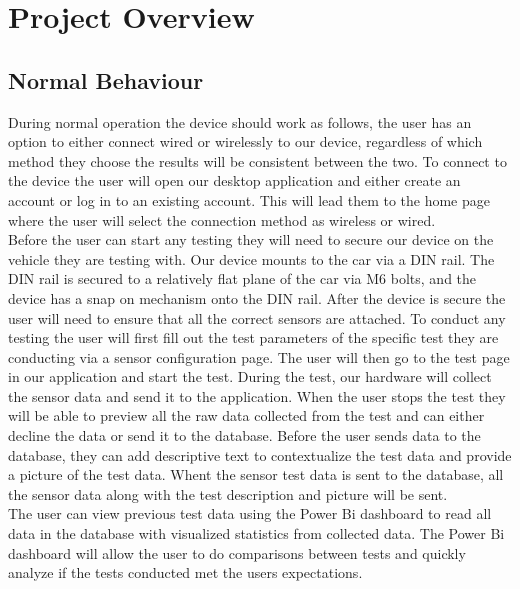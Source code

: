 \documentclass[12pt, titlepage]{article}
\begin{document}
\section{Project Overview}

\subsection{Normal Behaviour}
During normal operation the device should work as follows, the user has an option to either connect wired or wirelessly to our device, regardless of which method they choose the results will be consistent between the two. To connect to the device the user will open our desktop application and either create an account or log in to an existing account. This will lead them to the home page where the user will select the connection method as wireless or wired.\\

Before the user can start any testing they will need to secure our device on the vehicle they are testing with. Our device mounts to the car via a DIN rail. The DIN rail is secured to a relatively flat plane of the car via M6 bolts, and the device has a snap on mechanism onto the DIN rail. After the device is secure the user will need to ensure that all the correct sensors are attached. To conduct any testing the user will first fill out the test parameters of the specific test they are conducting via a sensor configuration page. The user will then go to the test page in our application and start the test. During the test, our hardware will collect the sensor data and send it to the application. When the user stops the test they will be able to preview all the raw data collected from the test and can either decline the data or send it to the database. Before the user sends data to the database, they can add descriptive text to contextualize the test data and provide a picture of the test data. Whent the sensor test data is sent to the database, all the sensor data along with the test description and picture will be sent.\\

The user can view previous test data using the Power Bi dashboard to read all data in the database with visualized statistics from collected data. The Power Bi dashboard will allow the user to do comparisons between tests and quickly analyze if the tests conducted met the users expectations.
\end{document}

